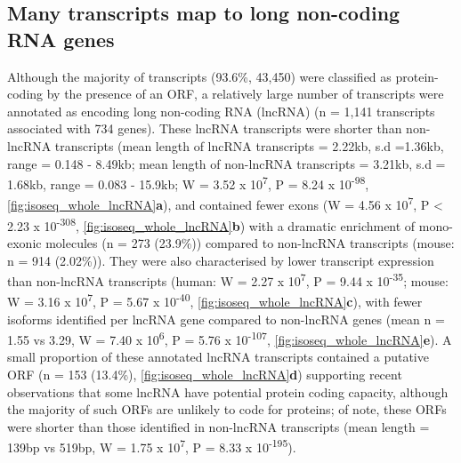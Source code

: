 \subsection{Many transcripts map to long non-coding RNA genes}
Although the majority of transcripts (93.6\%, 43,450) were classified as protein-coding by the presence of an ORF, a relatively large number of transcripts were annotated as encoding long non-coding RNA (lncRNA) (n = 1,141 transcripts associated with 734 genes). These lncRNA transcripts were shorter than non-lncRNA transcripts (mean length of lncRNA transcripts = 2.22kb, s.d =1.36kb, range = 0.148 - 8.49kb; mean length of non-lncRNA transcripts = 3.21kb, s.d = 1.68kb, range = 0.083 - 15.9kb; W = 3.52 x 10\textsuperscript{7}, P = 8.24 x 10\textsuperscript{-98}, \cref{fig:isoseq_whole_lncRNA}\textbf{a}), and contained fewer exons\cite{Statello2020} (W = 4.56 x 10\textsuperscript{7}, P < 2.23 x 10\textsuperscript{-308}, \cref{fig:isoseq_whole_lncRNA}\textbf{b}) with a dramatic enrichment of mono-exonic molecules\cite{Kuo2017} (n = 273 (23.9\%)) compared to non-lncRNA transcripts (mouse: n = 914 (2.02\%)). They were also characterised by lower transcript expression than non-lncRNA transcripts\cite{Statello2020, Liu2016a} (human: W = 2.27 x 10\textsuperscript{7}, P = 9.44 x 10\textsuperscript{-35}; mouse: W = 3.16 x 10\textsuperscript{7}, P = 5.67 x 10\textsuperscript{-40}, \cref{fig:isoseq_whole_lncRNA}\textbf{c}), with fewer isoforms identified per lncRNA gene compared to non-lncRNA genes (mean n = 1.55 vs 3.29, W = 7.40 x 10\textsuperscript{6}, P = 5.76 x 10\textsuperscript{-107}, \cref{fig:isoseq_whole_lncRNA}\textbf{e}). A small proportion of these annotated lncRNA transcripts contained a putative ORF (n = 153 (13.4\%), \cref{fig:isoseq_whole_lncRNA}\textbf{d}) supporting recent observations that some lncRNA have potential protein coding capacity\cite{Kageyama2011}, although the majority of such ORFs are unlikely to code for proteins\cite{Guttman2013}; of note, these ORFs were shorter than those identified in non-lncRNA transcripts (mean length = 139bp vs 519bp, W = 1.75 x 10\textsuperscript{7}, P = 8.33 x 10\textsuperscript{-195}). 

